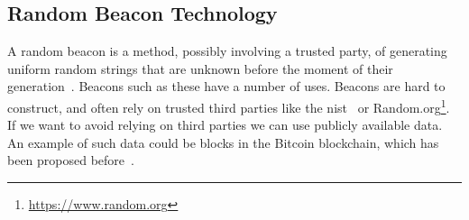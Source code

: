 \subsection{Random Beacon Technology}
A random beacon is a method, possibly involving a trusted party, of generating uniform random strings that are unknown before the moment of their generation~\cite{andrychowicz2014distributed}. Beacons such as these have a number of uses. Beacons are hard to construct, and often rely on trusted third parties like the \acrfull{nist}~\cite{nistbeacon} or Random.org\footnote{\url{https://www.random.org}}. If we want to avoid relying on third parties we can use publicly available data. An example of such data could be blocks in the Bitcoin blockchain, which has been proposed before~\cite{bonneau2015bitcoin}.
